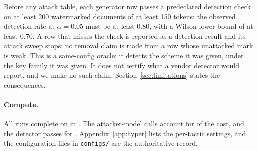 Before any attack table, each generator row passes a predeclared detection check on at least 200 watermarked documents of at least 150 tokens: the observed detection rate at $\alpha = 0.05$ must be at least $0.80$, with a Wilson lower bound of at least $0.70$. A row that misses the check is reported as a detection result and its attack sweep stops; no removal claim is made from a row whose unattacked mark is weak. This is a same-config oracle: it detects the scheme it was given, under the key family it was given. It does not certify what a vendor detector would report, and we make no such claim. Section~\ref{sec:limitations} states the consequences.

\paragraph{Compute.}
All runs complete on  in . The attacker-model calls account for  of the cost, and the detector passes for . Appendix~\ref{app:hyper} lists the per-tactic settings, and the configuration files in \texttt{configs/} are the authoritative record.
